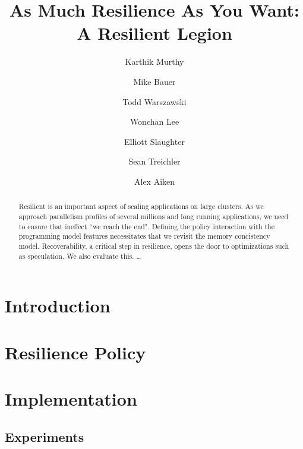 \documentclass{llncs}
\begin{document}
\mainmatter              %
%
\title{As Much Resilience As You Want: \\A Resilient Legion}
%
 
\author{Karthik Murthy \and
Mike Bauer \and 
Todd Warszawski\and 
Wonchan Lee \and
Elliott Slaughter \and
Sean Treichler \and
Alex Aiken
}
%

\maketitle              %

\begin{abstract} 
Resilient is an important aspect of scaling applications on
large clusters. As we approach parallelism profiles of several millions and long running applications, we need to ensure that ineffect ``we reach the end".
Defining the policy interaction with the programming model features necessitates that we revisit the memory concistency model. 
Recoverability, a critical step in
resilience, opens the door to optimizations such as speculation. We also
evaluate this.  \dots
{}
\end{abstract}

%
\section{Introduction}

\section{Resilience Policy}





\section{Implementation}



\subsection{Experiments}
\end{document}
